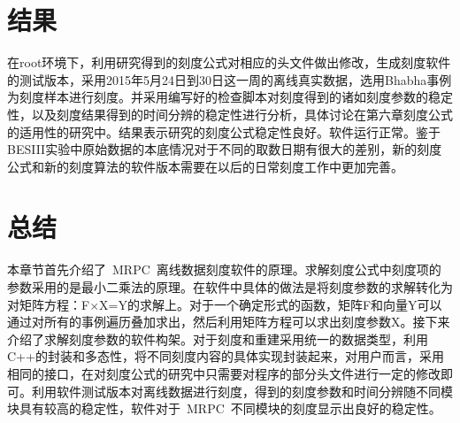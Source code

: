 \section{结果}
在root环境下，利用研究得到的刻度公式对相应的头文件做出修改，生成刻度软件的测试版本，采用2015年5月24日到30日这一周的离线真实数据，选用Bhabha事例为刻度样本进行刻度。并采用编写好的检查脚本对刻度得到的诸如刻度参数的稳定性，以及刻度结果得到的时间分辨的稳定性进行分析，具体讨论在第六章刻度公式的适用性的研究中。结果表示研究的刻度公式稳定性良好。软件运行正常。鉴于BESIII实验中原始数据的本底情况对于不同的取数日期有很大的差别，新的刻度公式和新的刻度算法的软件版本需要在以后的日常刻度工作中更加完善。

\section{总结}
本章节首先介绍了~MRPC~离线数据刻度软件的原理。求解刻度公式中刻度项的参数采用的是最小二乘法的原理。在软件中具体的做法是将刻度参数的求解转化为对矩阵方程：F$\times$X=Y的求解上。对于一个确定形式的函数，矩阵F和向量Y可以通过对所有的事例遍历叠加求出，然后利用矩阵方程可以求出刻度参数X。接下来介绍了求解刻度参数的软件构架。对于刻度和重建采用统一的数据类型，利用C++的封装和多态性，将不同刻度内容的具体实现封装起来，对用户而言，采用相同的接口，在对刻度公式的研究中只需要对程序的部分头文件进行一定的修改即可。利用软件测试版本对离线数据进行刻度，得到的刻度参数和时间分辨随不同模块具有较高的稳定性，软件对于~MRPC~不同模块的刻度显示出良好的稳定性。

\begin{comment}
std::string m\_calibItem=“0000111111101”
//              0    1     2     3  *  4     5     6     7     8      *    9     10         11       12

// Endcap(Scin) veff atten sigma time                        Endcap (MRPC) veff  time/data  time/mc  bunch

//                              Barrel veff  atten sigma time  bunch3/4

指定刻度的内容：其中前4项指的是原来端盖的闪烁体的刻度；中间5项为桶部闪烁体的刻度，后面4项为MRPC的刻度：分别对应有效速度的刻度；数据时间的刻度；模拟时间的刻度，以及束团的刻度。
\end{comment}








